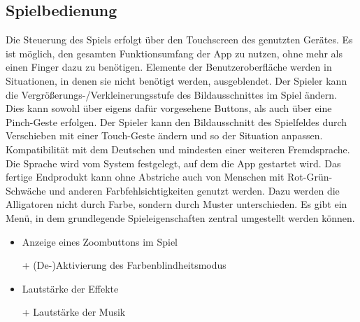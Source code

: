 \subsection {Spielbedienung}
\begin {requirements}
	 Die Steuerung des Spiels erfolgt über den Touchscreen des genutzten Gerätes.
	 Es ist möglich, den gesamten Funktionsumfang der App zu nutzen, ohne mehr als einen Finger dazu zu benötigen.
	 Elemente der Benutzeroberfläche werden in Situationen, in denen sie nicht benötigt werden, ausgeblendet.
	 Der Spieler kann die Vergrößerungs-/Verkleinerungsstufe des Bildausschnittes im Spiel ändern.
	Dies kann sowohl über eigens dafür vorgesehene Buttons, als auch über eine Pinch-Geste erfolgen.
	Der Spieler kann den Bildausschnitt des Spielfeldes durch Verschieben mit einer Touch-Geste ändern und so der Situation anpassen.
	Kompatibilität mit dem Deutschen und mindesten einer weiteren Fremdsprache.
	Die Sprache wird vom System festgelegt, auf dem die App gestartet wird.
	Das fertige Endprodukt kann ohne Abstriche auch von Menschen mit Rot-Grün-Schwäche und anderen Farbfehlsichtigkeiten genutzt werden.
	Dazu werden die Alligatoren nicht durch Farbe, sondern durch Muster unterschieden.
	 Es gibt ein Menü, in dem grundlegende Spieleigenschaften zentral umgestellt werden können.
		\begin{itemize}
			\item Anzeige eines Zoombuttons im Spiel
			\item[+] (De-)Aktivierung des Farbenblindheitsmodus
			\item Lautstärke der Effekte
			\item[+] Lautstärke der Musik
		\end{itemize}
\end {requirements}

